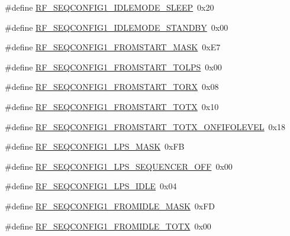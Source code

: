 \begin{DoxyCompactItemize}
\#define \mbox{\hyperlink{sx1276_regs-_fsk_8h_aeb8f9f145245df6d737b93f2d26cdc3a}{R\+F\+\_\+\+S\+E\+Q\+C\+O\+N\+F\+I\+G1\+\_\+\+I\+D\+L\+E\+M\+O\+D\+E\+\_\+\+S\+L\+E\+EP}}~0x20
\item 
\#define \mbox{\hyperlink{sx1276_regs-_fsk_8h_a4994de24c1c0ada3cba71f4cb9ff91db}{R\+F\+\_\+\+S\+E\+Q\+C\+O\+N\+F\+I\+G1\+\_\+\+I\+D\+L\+E\+M\+O\+D\+E\+\_\+\+S\+T\+A\+N\+D\+BY}}~0x00
\item 
\#define \mbox{\hyperlink{sx1276_regs-_fsk_8h_a842ad530378141c3522950f4ed4a6278}{R\+F\+\_\+\+S\+E\+Q\+C\+O\+N\+F\+I\+G1\+\_\+\+F\+R\+O\+M\+S\+T\+A\+R\+T\+\_\+\+M\+A\+SK}}~0x\+E7
\item 
\#define \mbox{\hyperlink{sx1276_regs-_fsk_8h_a180dc23f59acdec302255e7fe8fdd7b5}{R\+F\+\_\+\+S\+E\+Q\+C\+O\+N\+F\+I\+G1\+\_\+\+F\+R\+O\+M\+S\+T\+A\+R\+T\+\_\+\+T\+O\+L\+PS}}~0x00
\item 
\#define \mbox{\hyperlink{sx1276_regs-_fsk_8h_a41fd3a8ddc9ada2815a3fab3da9f285f}{R\+F\+\_\+\+S\+E\+Q\+C\+O\+N\+F\+I\+G1\+\_\+\+F\+R\+O\+M\+S\+T\+A\+R\+T\+\_\+\+T\+O\+RX}}~0x08
\item 
\#define \mbox{\hyperlink{sx1276_regs-_fsk_8h_aa2d23a14e3b777e4facefba5816e2d77}{R\+F\+\_\+\+S\+E\+Q\+C\+O\+N\+F\+I\+G1\+\_\+\+F\+R\+O\+M\+S\+T\+A\+R\+T\+\_\+\+T\+O\+TX}}~0x10
\item 
\#define \mbox{\hyperlink{sx1276_regs-_fsk_8h_aa02ee770e23b0c4a96bcc52f0766f36a}{R\+F\+\_\+\+S\+E\+Q\+C\+O\+N\+F\+I\+G1\+\_\+\+F\+R\+O\+M\+S\+T\+A\+R\+T\+\_\+\+T\+O\+T\+X\+\_\+\+O\+N\+F\+I\+F\+O\+L\+E\+V\+EL}}~0x18
\item 
\#define \mbox{\hyperlink{sx1276_regs-_fsk_8h_a02ee763d7a7708377930505f75a3186c}{R\+F\+\_\+\+S\+E\+Q\+C\+O\+N\+F\+I\+G1\+\_\+\+L\+P\+S\+\_\+\+M\+A\+SK}}~0x\+FB
\item 
\#define \mbox{\hyperlink{sx1276_regs-_fsk_8h_aec8c7e8c3338f262ec4d0f345846a386}{R\+F\+\_\+\+S\+E\+Q\+C\+O\+N\+F\+I\+G1\+\_\+\+L\+P\+S\+\_\+\+S\+E\+Q\+U\+E\+N\+C\+E\+R\+\_\+\+O\+FF}}~0x00
\item 
\#define \mbox{\hyperlink{sx1276_regs-_fsk_8h_a1b623685f94da423e0c38564e9ca3db0}{R\+F\+\_\+\+S\+E\+Q\+C\+O\+N\+F\+I\+G1\+\_\+\+L\+P\+S\+\_\+\+I\+D\+LE}}~0x04
\item 
\#define \mbox{\hyperlink{sx1276_regs-_fsk_8h_ab1e6c8bba2d45e7fc1f08440f818d0d7}{R\+F\+\_\+\+S\+E\+Q\+C\+O\+N\+F\+I\+G1\+\_\+\+F\+R\+O\+M\+I\+D\+L\+E\+\_\+\+M\+A\+SK}}~0x\+FD
\item 
\#define \mbox{\hyperlink{sx1276_regs-_fsk_8h_a0f54c10177f68ae9802ae741bbdc9493}{R\+F\+\_\+\+S\+E\+Q\+C\+O\+N\+F\+I\+G1\+\_\+\+F\+R\+O\+M\+I\+D\+L\+E\+\_\+\+T\+O\+TX}}~0x00

\end{DoxyCompactItemize}

